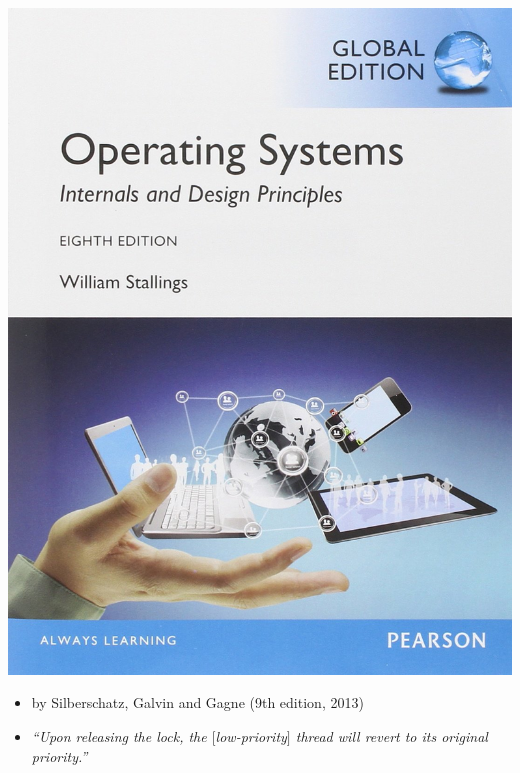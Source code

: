 \documentclass[dvipsnames,14pt,t]{beamer}
\begin{document}
  \begin{frame}[c]

  \begin{center}
  \includegraphics[scale=0.22]{pics/p5.jpg}
  \end{center}

  \begin{itemize}
  \item by Silberschatz, Galvin and Gagne (9th edition, 2013)
  \item \it ``Upon releasing the
  lock, the $[$low-priority$]$ thread will revert to its original
  priority.''
  \end{itemize}

  \end{frame}
    
\end{document}
